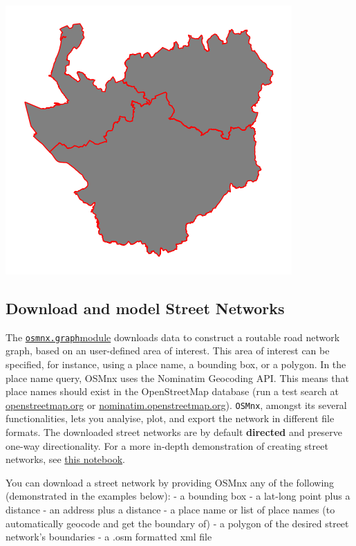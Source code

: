 \documentclass[
  letterpaper,
  DIV=11,
  numbers=noendperiod]{scrreprt}
\begin{document}
\includegraphics{labs/w07_OSM_files/figure-pdf/cell-5-output-1.png}

\subsection{Download and model Street
Networks}\label{download-and-model-street-networks}

The
\href{https://osmnx.readthedocs.io/en/stable/osmnx.html\#module-osmnx.graph}{\texttt{osmnx.graph}module}
downloads data to construct a routable road network graph, based on an
user-defined area of interest. This area of interest can be specified,
for instance, using a place name, a bounding box, or a polygon. In the
place name query, OSMnx uses the Nominatim Geocoding API. This means
that place names should exist in the OpenStreetMap database (run a test
search at \href{https://www.openstreetmap.org/}{openstreetmap.org} or
\href{https://nominatim.openstreetmap.org/ui/search.html}{nominatim.openstreetmap.org}).
\texttt{OSMnx}, amongst its several functionalities, lets you analyise,
plot, and export the network in different file formats. The downloaded
street networks are by default \textbf{directed} and preserve one-way
directionality. For a more in-depth demonstration of creating street
networks, see \href{03-graph-place-queries.ipynb}{this notebook}.

You can download a street network by providing OSMnx any of the
following (demonstrated in the examples below): - a bounding box - a
lat-long point plus a distance - an address plus a distance - a place
name or list of place names (to automatically geocode and get the
boundary of) - a polygon of the desired street network's boundaries - a
.osm formatted xml file
\end{document}
